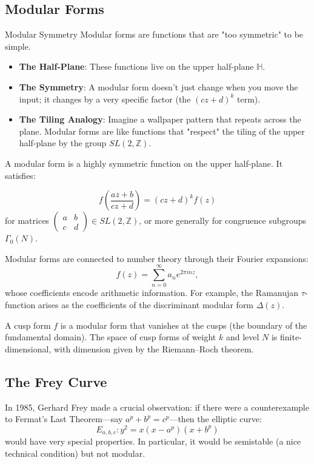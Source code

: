 \subsection{Modular Forms}

\begin{knowledgebridge}{Modular Symmetry}
Modular forms are functions that are "too symmetric" to be simple.
\begin{itemize}
    \item \textbf{The Half-Plane}: These functions live on the upper half-plane $\mathbb{H}$.
    \item \textbf{The Symmetry}: A modular form doesn't just change when you move the input; it changes by a very specific factor (the $(cz+d)^k$ term).
    \item \textbf{The Tiling Analogy}: Imagine a wallpaper pattern that repeats across the plane. Modular forms are like functions that "respect" the tiling of the upper half-plane by the group $SL(2, \mathbb{Z})$.
\end{itemize}
\end{knowledgebridge}

A modular form is a highly symmetric function on the upper half-plane. It satisfies:

\[
f\left(\frac{az + b}{cz + d}\right) = (cz + d)^k f(z)
\]
for matrices $\begin{pmatrix} a & b \\ c & d \end{pmatrix} \in SL(2, \mathbb{Z})$, or more generally for congruence subgroups $\Gamma_0(N)$.

Modular forms are connected to number theory through their Fourier expansions:
\[
f(z) = \sum_{n=0}^{\infty} a_n e^{2\pi i n z},
\]
whose coefficients encode arithmetic information. For example, the Ramanujan $\tau$-function arises as the coefficients of the discriminant modular form $\Delta(z)$.

A cusp form $f$ is a modular form that vanishes at the cusps (the boundary of the fundamental domain). The space of cusp forms of weight $k$ and level $N$ is finite-dimensional, with dimension given by the Riemann--Roch theorem.

\subsection{The Frey Curve}

In 1985, Gerhard Frey made a crucial observation: if there were a counterexample to Fermat's Last Theorem---say $a^p + b^p = c^p$---then the elliptic curve:
\[
E_{a,b,c}: y^2 = x(x - a^p)(x + b^p)
\]
would have very special properties. In particular, it would be semistable (a nice technical condition) but not modular.


